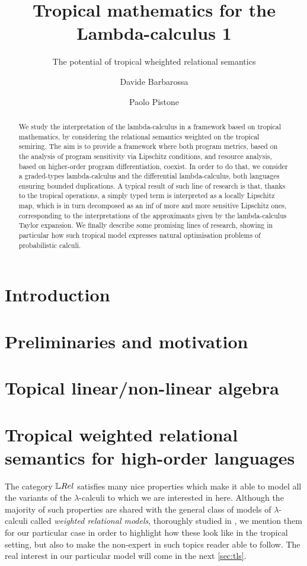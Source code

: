 \documentclass[a4paper,UKenglish,cleveref, autoref, thm-restate]{lipics-v2021}
\title{Tropical mathematics for the Lambda-calculus 1}
\subtitle{The potential of tropical wheighted relational semantics%
} %
\author{Davide {Barbarossa}}{Dipartimento di Informatica, Universit\`a di Bologna, %
Italy%
\and \url{https://lipn.univ-paris13.fr/\~barbarossa/index.html} }{davide.barbarossa@unibo.it}{https://orcid.org/0000-0003-4608-8282}{%
}%
\author{Paolo {Pistone}}{Dipartimento di Informatica, Universit\`a di Bologna, %
Italy%
\and \url{%
} }{paolo.pistone2@unibo.it}{%
}{%
}
\begin{document}
\maketitle

\begin{abstract}
We study the interpretation of the lambda-calculus in a framework based on tropical mathematics, by considering the relational semantics weighted on the tropical semiring. The aim is to provide a framework where both program metrics, based on the analysis of program sensitivity via Lipschitz conditions, and resource analysis, based on higher-order program differentiation, coexist. In order to do that, we consider a graded-types lambda-calculus and the differential lambda-calculus, both languages ensuring bounded duplications.
A typical result of such line of research is that, thanks to the tropical operations, a simply typed term is interpreted as a locally Lipschitz map, which is in turn decomposed as an inf of more and more sensitive Lipschitz ones, corresponding to the interpretations of the approximants given by the lambda-calculus Taylor expansion.
We finally describe some promising lines of research, showing in particular how such tropical model expresses natural optimisation problems of probabilistic calculi.
\end{abstract}

\section{Introduction}



\section{Preliminaries and motivation}


\section{Topical linear/non-linear algebra}\label{section3}


\section{Tropical weighted relational semantics for high-order languages}

The category $\LREL$ satisfies many nice properties which make it able to model all the variants of the $\lambda$-calculi to which we are interested in here. Although the majority of such properties are shared with the general class of models of $\lambda$-calculi called \emph{weighted relational models}, thoroughly studied in \cite{Manzo2013}, we mention them for our particular case in order to highlight how these look like in the tropical setting, but also to make the non-expert in such topics reader able to follow.
The real interest in our particular model will come in the next \autoref{sec:tls}.
\end{document}
